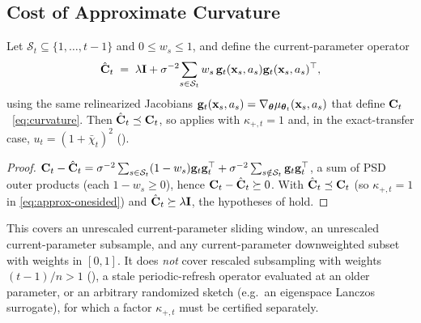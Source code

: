 \subsection{Cost of Approximate Curvature}

\begin{proposition}\label{prop:window}
Let $\mathcal{S}_t\subseteq\{1,\dots,t{-}1\}$ and $0\le w_s\le1$, and define the
current-parameter operator
\[
  \hat{\mathbf{C}}_t
  \;=\;
  \lambda\mathbf{I}
  +\sigma^{-2}\!\sum_{s\in\mathcal{S}_t} w_s\,
  \mathbf{g}_t(\mathbf{x}_s,a_s)\mathbf{g}_t(\mathbf{x}_s,a_s)^\top ,
\]
using the same relinearized Jacobians $\mathbf{g}_t(\mathbf{x}_s,a_s)=\nabla_{\boldsymbol{\theta}}
\mu_{\boldsymbol{\theta}_t}(\mathbf{x}_s,a_s)$ that define $\mathbf{C}_t$~\eqref{eq:curvature}.  Then
$\hat{\mathbf{C}}_t\preceq\mathbf{C}_t$, so  applies with
$\kappa_{+,t}=1$ and, in the exact-transfer case, $u_t=(1+\bar\chi_t)^2$
().
\end{proposition}
\begin{proof}
$\mathbf{C}_t-\hat{\mathbf{C}}_t=\sigma^{-2}\sum_{s\in\mathcal{S}_t}(1-w_s)\mathbf{g}_t\mathbf{g}_t^\top
+\sigma^{-2}\sum_{s\notin\mathcal{S}_t}\mathbf{g}_t\mathbf{g}_t^\top$, a sum of PSD outer
products (each $1-w_s\ge0$), hence $\mathbf{C}_t-\hat{\mathbf{C}}_t\succeq0$.  With
$\hat{\mathbf{C}}_t\preceq\mathbf{C}_t$ (so $\kappa_{+,t}=1$ in
\eqref{eq:approx-onesided}) and $\hat{\mathbf{C}}_t\succeq\lambda\mathbf{I}$, the hypotheses of
 hold.
\end{proof}

\noindent
This covers an unrescaled current-parameter sliding window, an unrescaled
current-parameter subsample, and any current-parameter downweighted subset with
weights in $[0,1]$.  It does \emph{not} cover rescaled subsampling with weights
$(t{-}1)/n>1$ (), a stale periodic-refresh operator evaluated
at an older parameter, or an arbitrary randomized sketch (e.g.\ an eigenspace
Lanczos surrogate), for which a factor
$\kappa_{+,t}$ must be certified separately.

